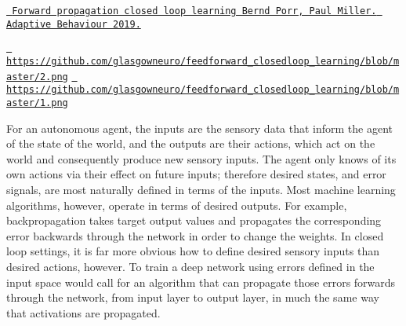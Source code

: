 \href{https://journals.sagepub.com/doi/10.1177/1059712319851070}{\texttt{ Forward propagation closed loop learning Bernd Porr, Paul Miller. Adaptive Behaviour 2019.}}

\href{https://github.com/glasgowneuro/feedforward_closedloop_learning/blob/master/2.png}{\texttt{ https\+://github.\+com/glasgowneuro/feedforward\+\_\+closedloop\+\_\+learning/blob/master/2.\+png}} \href{https://github.com/glasgowneuro/feedforward_closedloop_learning/blob/master/1.png}{\texttt{ https\+://github.\+com/glasgowneuro/feedforward\+\_\+closedloop\+\_\+learning/blob/master/1.\+png}}

For an autonomous agent, the inputs are the sensory data that inform the agent of the state of the world, and the outputs are their actions, which act on the world and consequently produce new sensory inputs. The agent only knows of its own actions via their effect on future inputs; therefore desired states, and error signals, are most naturally defined in terms of the inputs. Most machine learning algorithms, however, operate in terms of desired outputs. For example, backpropagation takes target output values and propagates the corresponding error backwards through the network in order to change the weights. In closed loop settings, it is far more obvious how to define desired sensory inputs than desired actions, however. To train a deep network using errors defined in the input space would call for an algorithm that can propagate those errors forwards through the network, from input layer to output layer, in much the same way that activations are propagated. 
